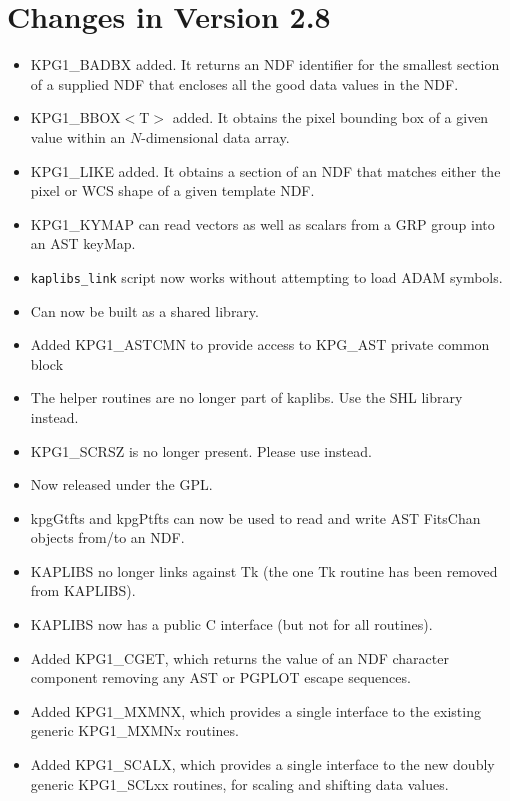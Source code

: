 \documentclass[11pt]{starlink}
\begin{document}
\section{Changes in Version 2.8}
\begin{itemize}

\item KPG1\_BADBX added. It returns an NDF identifier for the smallest section
      of a supplied NDF that encloses all the good data values in the NDF.
\item KPG1\_BBOX$<$T$>$ added. It obtains the pixel bounding box of a given
     value within an $N$-dimensional data array.
\item KPG1\_LIKE added. It obtains a section of an NDF that matches either
      the pixel or WCS shape of a given template NDF.
\item KPG1\_KYMAP can read vectors as well as scalars from a GRP
      group into an AST keyMap.
\item \texttt{kaplibs\_link} script now works without attempting to load ADAM
      symbols.
\item Can now be built as a shared library.
\item Added KPG1\_ASTCMN to provide access to KPG\_AST private common block
\item The  helper routines are no longer part of kaplibs.
      Use the SHL library instead.
\item KPG1\_SCRSZ is no longer present. Please use
       instead.
\item Now released under the GPL.
\item kpgGtfts and kpgPtfts can now be used to read and write
      AST FitsChan objects from/to an NDF.
\item KAPLIBS no longer links against Tk (the one Tk routine has been
      removed from KAPLIBS).
\item KAPLIBS now has a public C interface (but not for all routines).
\item Added KPG1\_CGET, which returns the value of an NDF character
      component removing any AST or PGPLOT escape sequences.
\item Added KPG1\_MXMNX, which provides a single interface to the
      existing generic KPG1\_MXMNx routines.
\item Added KPG1\_SCALX, which provides a single interface to the
      new doubly generic KPG1\_SCLxx routines, for scaling
      and shifting data values.
\end{itemize}
\end{document}
